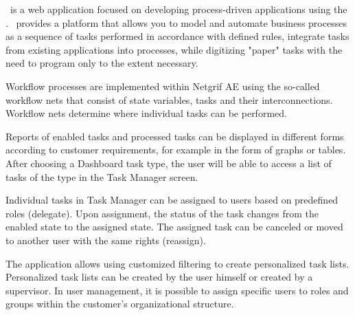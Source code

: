 \builder~is a web application focused on developing process-driven applications using the \engine.
\engine~provides a platform that allows you to model and automate business processes as a sequence of tasks performed
in accordance with defined rules, integrate tasks from existing applications into processes, while digitizing "paper"
tasks with the need to program only to the extent necessary.

Workflow processes are implemented within Netgrif AE using the so-called workflow nets that consist of state variables,
tasks and their interconnections.
Workflow nets determine where individual tasks can be performed.

Reports of enabled tasks and processed tasks can be displayed in different forms according to customer requirements,
for example in the form of graphs or tables.
After choosing a Dashboard task type, the user will be able to access a list of tasks of the type in the Task Manager screen.

Individual tasks in Task Manager can be assigned to users based on predefined roles (delegate).
Upon assignment, the status of the task changes from the enabled state to the assigned state.
The assigned task can be canceled or moved to another user with the same rights (reassign).

The application allows using customized filtering to create personalized task lists.
Personalized task lists can be created by the user himself or created by a supervisor.
In user management, it is possible to assign specific users to roles and groups within the customer's organizational structure.
